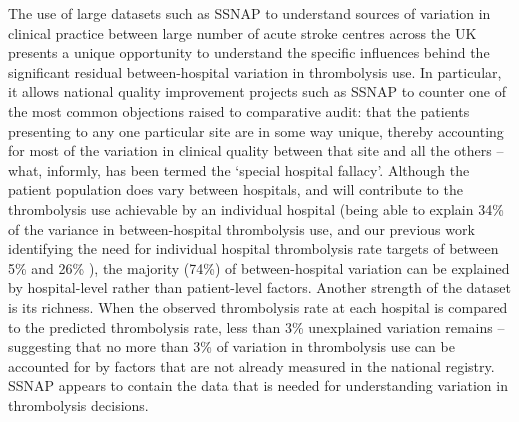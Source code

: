 The use of large datasets such as SSNAP to understand sources of variation in clinical practice between large number of acute stroke centres across the UK presents a unique opportunity to understand the specific influences behind the significant residual between-hospital variation in thrombolysis use. In particular, it allows national quality improvement projects such as SSNAP to counter one of the most common objections raised to comparative audit: that the patients presenting to any one particular site are in some way unique, thereby accounting for most of the variation in clinical quality between that site and all the others – what, informly, has been termed the `special hospital fallacy'. Although the patient population does vary between hospitals, and will contribute to the thrombolysis use achievable by an individual hospital (being able to explain 34\% of the variance in between-hospital thrombolysis use, and our previous work identifying the need for individual hospital thrombolysis rate targets of between 5\% and 26\% \cite{allen_use_2022}), the majority (74\%) of between-hospital variation can be explained by hospital-level rather than patient-level factors. Another strength of the dataset is its richness. When the observed thrombolysis rate at each hospital is compared to the predicted thrombolysis rate, less than 3\% unexplained variation remains – suggesting that no more than 3\% of variation in thrombolysis use can be accounted for by factors that are not already measured in the national registry. SSNAP appears to contain the data that is needed for understanding variation in thrombolysis decisions. 

